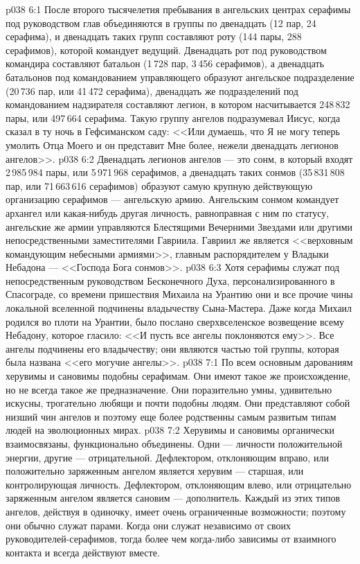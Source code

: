 \vs p038 6:1 После второго тысячелетия пребывания в ангельских центрах серафимы под руководством глав объединяются в группы по двенадцать (12 пар, 24 серафима), и двенадцать таких групп составляют роту (144 пары, 288 серафимов), которой командует ведущий. Двенадцать рот под руководством командира составляют батальон (1\,728 пар, 3\,456 серафимов), а двенадцать батальонов под командованием управляющего образуют ангельское подразделение (20\,736 пар, или 41\,472 серафима), двенадцать же подразделений под командованием надзирателя составляют легион, в котором насчитывается 248\,832 пары, или 497\,664 серафима. Такую группу ангелов подразумевал Иисус, когда сказал в ту ночь в Гефсиманском саду: <<Или думаешь, что Я не могу теперь умолить Отца Моего и он представит Мне более, нежели двенадцать легионов ангелов>>.
\vs p038 6:2 Двенадцать легионов ангелов --- это сонм, в который входят 2\,985\,984 пары, или 5\,971\,968 серафимов, а двенадцать таких сонмов (35\,831\,808 пар, или 71\,663\,616 серафимов) образуют самую крупную действующую организацию серафимов --- ангельскую армию. Ангельским сонмом командует архангел или какая\hyp{}нибудь другая личность, равноправная с ним по статусу, ангельские же армии управляются Блестящими Вечерними Звездами или другими непосредственными заместителями Гавриила. Гавриил же является <<верховным командующим небесными армиями>>, главным распорядителем у Владыки Небадона --- <<Господа Бога сонмов>>.
\vs p038 6:3 Хотя серафимы служат под непосредственным руководством Бесконечного Духа, персонализированного в Спасограде, со времени пришествия Михаила на Урантию они и все прочие чины локальной вселенной подчинены владычеству Сына\hyp{}Мастера. Даже когда Михаил родился во плоти на Урантии, было послано сверхвселенское возвещение всему Небадону, которое гласило: <<И пусть все ангелы поклоняются ему>>. Все ангелы подчинены его владычеству; они являются частью той группы, которая была названа <<его могучие ангелы>>.
\vs p038 7:1 По всем основным дарованиям херувимы и сановимы подобны серафимам. Они имеют такое же происхождение, но не всегда такое же предназначение. Они поразительно умны, удивительно искусны, трогательно любящи и почти подобны людям. Они представляют собой низший чин ангелов и поэтому еще более родственны самым развитым типам людей на эволюционных мирах.
\vs p038 7:2 Херувимы и сановимы органически взаимосвязаны, функционально объединены. Одни --- личности положительной энергии, другие --- отрицательной. Дефлектором, отклоняющим вправо, или положительно заряженным ангелом является херувим --- старшая, или контролирующая личность. Дефлектором, отклоняющим влево, или отрицательно заряженным ангелом является сановим --- дополнитель. Каждый из этих типов ангелов, действуя в одиночку, имеет очень ограниченные возможности; поэтому они обычно служат парами. Когда они служат независимо от своих руководителей\hyp{}серафимов, тогда более чем когда\hyp{}либо зависимы от взаимного контакта и всегда действуют вместе.
